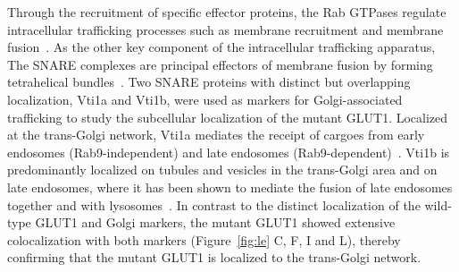 Through the recruitment of specific effector proteins, the Rab GTPases regulate intracellular trafficking processes such as membrane recruitment and membrane fusion~\cite{Stenmark}. As the other key component of the intracellular trafficking apparatus, The SNARE complexes are principal effectors of membrane fusion by forming tetrahelical bundles~\cite{Stenmark,Chen,Ohya}. Two SNARE proteins with distinct but overlapping localization, Vti1a and Vti1b, were used as markers for Golgi-associated trafficking to study the subcellular localization of the mutant GLUT1. Localized at the trans-Golgi network, Vti1a mediates the receipt of cargoes from early endosomes (Rab9-independent) and late endosomes (Rab9-dependent)~\cite{Ganley}. Vti1b is predominantly localized on tubules and vesicles in the trans-Golgi area and on late endosomes, where it has been shown to mediate the fusion of late endosomes together and with lysosomes~\cite{Kreykenbohm,Antonin,Pryor}. In contrast to the distinct localization of the wild-type GLUT1 and Golgi markers, the mutant GLUT1 showed extensive colocalization with both markers (Figure~\ref{fig:le} C, F, I and L), thereby confirming that the mutant GLUT1 is localized to the trans-Golgi network.

